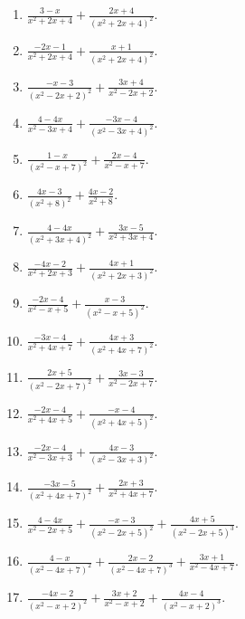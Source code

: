 \documentclass[11pt,oneside]{book}
\begin{document}
\begin{enumerate}[leftmargin=*,label=\textbf{X\arabic*.},itemsep=0.45\baselineskip]
\item $\displaystyle \frac{3 - x}{x^{2} + 2 x + 4} + \frac{2 x + 4}{\left(x^{2} + 2 x + 4\right)^{2}}$.
\item $\displaystyle \frac{- 2 x - 1}{x^{2} + 2 x + 4} + \frac{x + 1}{\left(x^{2} + 2 x + 4\right)^{2}}$.
\item $\displaystyle \frac{- x - 3}{\left(x^{2} - 2 x + 2\right)^{2}} + \frac{3 x + 4}{x^{2} - 2 x + 2}$.
\item $\displaystyle \frac{4 - 4 x}{x^{2} - 3 x + 4} + \frac{- 3 x - 4}{\left(x^{2} - 3 x + 4\right)^{2}}$.
\item $\displaystyle \frac{1 - x}{\left(x^{2} - x + 7\right)^{2}} + \frac{2 x - 4}{x^{2} - x + 7}$.
\item $\displaystyle \frac{4 x - 3}{\left(x^{2} + 8\right)^{2}} + \frac{4 x - 2}{x^{2} + 8}$.
\item $\displaystyle \frac{4 - 4 x}{\left(x^{2} + 3 x + 4\right)^{2}} + \frac{3 x - 5}{x^{2} + 3 x + 4}$.
\item $\displaystyle \frac{- 4 x - 2}{x^{2} + 2 x + 3} + \frac{4 x + 1}{\left(x^{2} + 2 x + 3\right)^{2}}$.
\item $\displaystyle \frac{- 2 x - 4}{x^{2} - x + 5} + \frac{x - 3}{\left(x^{2} - x + 5\right)^{2}}$.
\item $\displaystyle \frac{- 3 x - 4}{x^{2} + 4 x + 7} + \frac{4 x + 3}{\left(x^{2} + 4 x + 7\right)^{2}}$.
\item $\displaystyle \frac{2 x + 5}{\left(x^{2} - 2 x + 7\right)^{2}} + \frac{3 x - 3}{x^{2} - 2 x + 7}$.
\item $\displaystyle \frac{- 2 x - 4}{x^{2} + 4 x + 5} + \frac{- x - 4}{\left(x^{2} + 4 x + 5\right)^{2}}$.
\item $\displaystyle \frac{- 2 x - 4}{x^{2} - 3 x + 3} + \frac{4 x - 3}{\left(x^{2} - 3 x + 3\right)^{2}}$.
\item $\displaystyle \frac{- 3 x - 5}{\left(x^{2} + 4 x + 7\right)^{2}} + \frac{2 x + 3}{x^{2} + 4 x + 7}$.
\item $\displaystyle \frac{4 - 4 x}{x^{2} - 2 x + 5} + \frac{- x - 3}{\left(x^{2} - 2 x + 5\right)^{2}} + \frac{4 x + 5}{\left(x^{2} - 2 x + 5\right)^{3}}$.
\item $\displaystyle \frac{4 - x}{\left(x^{2} - 4 x + 7\right)^{2}} + \frac{2 x - 2}{\left(x^{2} - 4 x + 7\right)^{3}} + \frac{3 x + 1}{x^{2} - 4 x + 7}$.
\item $\displaystyle \frac{- 4 x - 2}{\left(x^{2} - x + 2\right)^{2}} + \frac{3 x + 2}{x^{2} - x + 2} + \frac{4 x - 4}{\left(x^{2} - x + 2\right)^{3}}$.

\end{enumerate}
\end{document}
